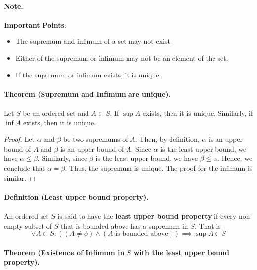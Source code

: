 \documentclass[openany]{book}
\numberwithin{equation}{section}
\begin{document}
\paragraph{Note.}

\textbf{Important Points}: 
\begin{itemize}
    \item The supremum and infimum of a set may not exist. 
    \item Either of the supremum or infimum may not be an element of the set.
    \item If the supremum or infimum exists, it is unique.
\end{itemize}
\par
\paragraph{Theorem (Supremum and Infimum are unique).}

    Let $S$ be an ordered set and $A \subset S$. If $\sup A$ exists, then it is unique. Similarly, if $\inf A$ exists, then it is unique.
\par
\begin{proof}
    Let $\alpha$ and $\beta$ be two supremums of $A$. Then, by definition, $\alpha$ is an upper bound of $A$ and $\beta$ is an upper bound of $A$. Since $\alpha$ is the least upper bound, we have $\alpha \leq \beta$. Similarly, since $\beta$ is the least upper bound, we have $\beta \leq \alpha$. Hence, we conclude that $\alpha = \beta$. Thus, the supremum is unique. The proof for the infimum is similar.
\end{proof}
\paragraph{Definition (Least upper bound property).}

    An ordered set $S$ is said to have the \textbf{least upper bound property} if every non-empty subset of $S$ that is bounded above has a supremum in $S$. That is - 
    $$\forall A \subset S: ((A \neq \phi) \wedge (A \text{ is bounded above})) \implies \sup A \in S$$
\par
\paragraph{Theorem (Existence of Infimum in $S$ with the least upper bound property).}
\end{document}
